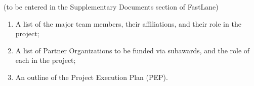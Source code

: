 \documentclass[oneside,11pt]{amsart}
\begin{document}


(to be entered in the Supplementary Documents section of FastLane)

\begin{enumerate}
%
\item A list of the major team members, their affiliations, and their
role in the project;
%
\item A list of Partner Organizations to be funded via subawards, and
the role of each in the project;
%
\item An outline of the Project Execution Plan (PEP).
\end{enumerate}


\end{document}
